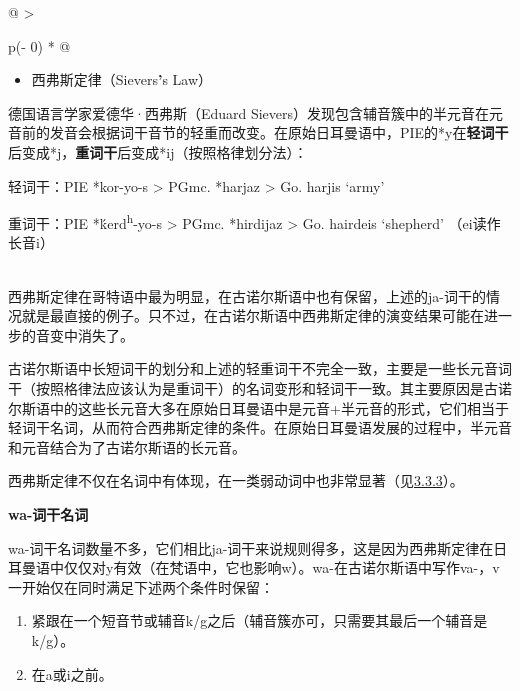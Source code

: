 \begin{longtable}[]{@{}
  >{\raggedright\arraybackslash}p{(\columnwidth - 0\tabcolsep) * }@{}}
  \toprule\noalign{}
  \begin{minipage}[b]{\linewidth}\raggedright
    \begin{itemize}
      \item
            西弗斯定律（Sievers\textbf{'}s Law）
    \end{itemize}

    德国语言学家爱德华·西弗斯（Eduard
    Sievers）发现包含辅音簇中的半元音在元音前的发音会根据词干音节的轻重而改变。在原始日耳曼语中，PIE的*y在\textbf{轻词干}后变成*j，\textbf{重词干}后变成*ij（按照格律划分法）：

    轻词干：PIE *kor-yo-s \textgreater{} PGmc. *harjaz \textgreater{} Go.
    harjis `army'

    重词干：PIE *ḱerd\textsuperscript{h}-yo-s \textgreater{} PGmc. *hirdijaz
    \textgreater{} Go. hairdeis `shepherd' （ei读作长音i）
  \end{minipage} \\
  \midrule\noalign{}
  \endhead
  \bottomrule\noalign{}
  \endlastfoot
  西弗斯定律在哥特语中最为明显，在古诺尔斯语中也有保留，上述的ja-词干的情况就是最直接的例子。只不过，在古诺尔斯语中西弗斯定律的演变结果可能在进一步的音变中消失了。

  古诺尔斯语中长短词干的划分和上述的轻重词干不完全一致，主要是一些长元音词干（按照格律法应该认为是重词干）的名词变形和轻词干一致。其主要原因是古诺尔斯语中的这些长元音大多在原始日耳曼语中是元音+半元音的形式，它们相当于轻词干名词，从而符合西弗斯定律的条件。在原始日耳曼语发展的过程中，半元音和元音结合为了古诺尔斯语的长元音。

  西弗斯定律不仅在名词中有体现，在一类弱动词中也非常显著（见\hyperref[ux7b2cux4e00ux5f31ux53d8ux4f4dux6cd5]{3.3.3}）。                                                       \\
\end{longtable}

\textbf{wa-词干名词}

wa-词干名词数量不多，它们相比ja-词干来说规则得多，这是因为西弗斯定律在日耳曼语中仅仅对y有效（在梵语中，它也影响w）。wa-在古诺尔斯语中写作va-，v一开始仅在同时满足下述两个条件时保留：

\begin{enumerate}
  \def\labelenumi{\arabic{enumi})}
  \item
        紧跟在一个短音节或辅音k/g之后（辅音簇亦可，只需要其最后一个辅音是k/g）。
  \item
        在a或i之前。
\end{enumerate}

